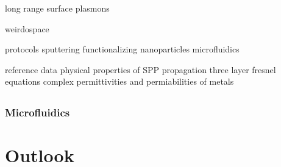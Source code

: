 \documentclass[a4paper]{report}
\begin{document}
long range surface plasmons

weirdospace

protocols
 sputtering
 functionalizing nanoparticles
 microfluidics

reference data
 physical properties of SPP propagation
 three layer fresnel equations
 complex permittivities and permiabilities of metals





%

\section{}

\section{}

\section{}


\section{}

\subsection{Microfluidics}

\chapter{Outlook}
\label{ch:outlook}
\end{document}
